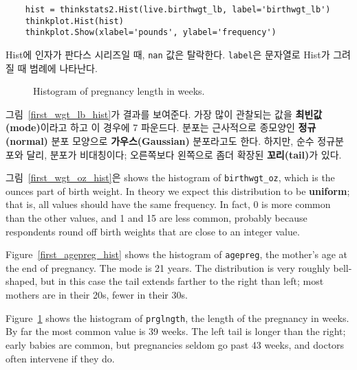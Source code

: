
\begin{verbatim}
    hist = thinkstats2.Hist(live.birthwgt_lb, label='birthwgt_lb')
    thinkplot.Hist(hist)
    thinkplot.Show(xlabel='pounds', ylabel='frequency')
\end{verbatim}

Hist에 인자가 판다스 시리즈일 때, {\tt nan} 값은 탈락한다. 
{\tt label}은 문자열로 Hist가 그려질 때 범례에 나타난다. 


\begin{figure}
\caption{Histogram of pregnancy length in weeks.}
\label{first_prglngth_hist}
\end{figure}

그림~\ref{first_wgt_lb_hist}가 결과를 보여준다.
가장 많이 관찰되는 값을 {\bf 최빈값(mode)}이라고 하고 이 경우에 7 파운드다. 
분포는 근사적으로 종모양인 {\bf 정규(normal)} 분포 모양으로 
{\bf 가우스(Gaussian)} 분포라고도 한다. 하지만, 순수 정규분포와 달리,
분포가 비대칭이다; 오른쪽보다 왼쪽으로 좀더 확장된 {\bf 꼬리(tail)}가 있다.


그림~\ref{first_wgt_oz_hist}은  shows the histogram of
\verb"birthwgt_oz", which is the ounces part of birth weight.  In
theory we expect this distribution to be {\bf uniform}; that is, all
values should have the same frequency.  In fact, 0 is more common than
the other values, and 1 and 15 are less common, probably because
respondents round off birth weights that are close to an integer
value.

Figure~\ref{first_agepreg_hist} shows the histogram of \verb"agepreg",
the mother's age at the end of pregnancy.  The mode is 21 years.  The
distribution is very roughly bell-shaped, but in this case the tail
extends farther to the right than left; most mothers are in
their 20s, fewer in their 30s.

Figure~\ref{first_prglngth_hist} shows the histogram of
\verb"prglngth", the length of the pregnancy in weeks.  By far the
most common value is 39 weeks.  The left tail is longer than the
right; early babies are common, but pregnancies seldom go past 43
weeks, and doctors often intervene if they do.


